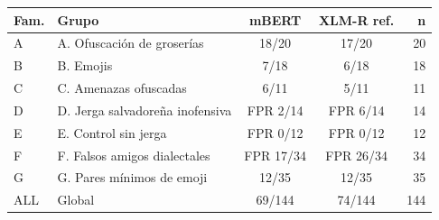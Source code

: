 \begin{tabular}{llccr}
\toprule
Fam. & Grupo & mBERT & XLM-R ref. & n \\
\midrule
A & A. Ofuscación de groserías & 18/20 & 17/20 & 20 \\
B & B. Emojis & 7/18 & 6/18 & 18 \\
C & C. Amenazas ofuscadas & 6/11 & 5/11 & 11 \\
D & D. Jerga salvadoreña inofensiva & FPR 2/14 & FPR 6/14 & 14 \\
E & E. Control sin jerga & FPR 0/12 & FPR 0/12 & 12 \\
F & F. Falsos amigos dialectales & FPR 17/34 & FPR 26/34 & 34 \\
G & G. Pares mínimos de emoji & 12/35 & 12/35 & 35 \\
ALL & Global & 69/144 & 74/144 & 144 \\
\bottomrule
\end{tabular}
